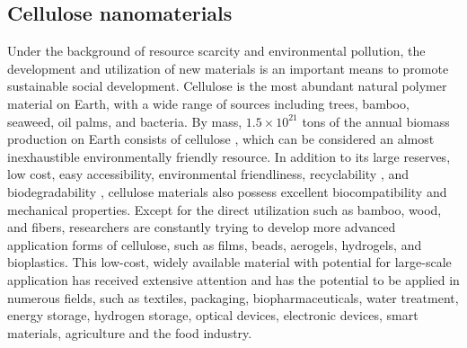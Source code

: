 \documentclass{article}
\begin{document}
\subsection{Cellulose nanomaterials}\indent

Under the background of resource scarcity and environmental pollution, the development and utilization of new materials is an important means to promote sustainable social development\cite{wang2016recent}.
Cellulose is the most abundant natural polymer material on Earth, with a wide range of sources including trees, bamboo, seaweed, oil palms, and bacteria.
By mass, $1.5 \times 10^{21}$ tons of the annual biomass production on Earth consists of cellulose \cite{kim2015review}, which can be considered an almost inexhaustible environmentally friendly resource\cite{moon2016overview}.
In addition to its large reserves, low cost, easy accessibility, environmental friendliness\cite{mohanty2002sustainable,teo2020towards}, recyclability \cite{mohanty2002sustainable,teo2020towards}, and biodegradability \cite{habibi2010cellulose,pandey2021pharmaceutical}, cellulose materials also possess excellent biocompatibility\cite{habibi2010cellulose,pandey2021pharmaceutical} and mechanical properties\cite{moon2011cellulose}.
Except for the direct utilization such as bamboo\cite{kim2015review}, wood\cite{kim2015review}, and fibers\cite{shen2010life,guan2021bio}, researchers are constantly trying to develop more advanced application forms of cellulose, such as films\cite{zhang20051,li2022recent}, beads\cite{gericke2013functional,hamidon2022cellulose}, aerogels\cite{zhou2007hydrogels,long2018cellulose}, hydrogels\cite{zhou2007hydrogels,bhaladhare2022cellulose}, and bioplastics\cite{wang2013bioplastic,hossain2024cellulose}.
This low-cost, widely available material with potential for large-scale application has received extensive attention\cite{wang2016recent,kim2015review,moon2011cellulose} and has the potential to be applied in numerous fields,
such as textiles\cite{muller2012viscont,felgueiras2021trends}, packaging\cite{qi2009properties,azeredo2019bacterial}, biopharmaceuticals\cite{liu2012magnetic,du2019cellulose}, water treatment\cite{liu2010microfiltration,yu2021water}, energy storage\cite{pushparaj2007flexible,ruan2018carbonized,liu2021cellulose}, hydrogen storage\cite{dhar2018cellulose,conte2024tuning}, optical devices\cite{guo2013preparation,hu2018transparent,nguyen2025enhancing}, electronic devices\cite{rahatekar2009solution,wang2024situ}, smart materials\cite{qiu2013smart,zhu2020stimuli}, agriculture\cite{boufi2017agricultural,firmanda2022controlled} and the food industry\cite{serpa2016vegetable,he2021cellulose}.
\end{document}
